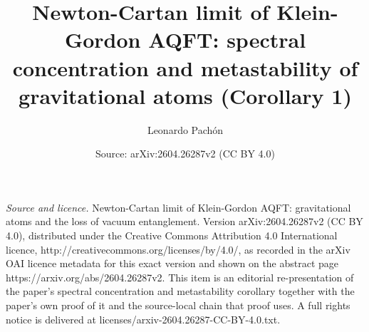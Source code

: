 \documentclass[10pt,a4paper]{amsart}
\title[Newton-Cartan limit of Klein-Gordon AQFT]{Newton-Cartan limit of Klein-Gordon AQFT: spectral concentration and metastability of gravitational atoms (Corollary 1)}
\author[Leonardo Pachon]{Leonardo
Pachón}
\date{Source: arXiv:2604.26287v2 (CC BY 4.0)}
\theoremstyle{definition}
\theoremstyle{remark}
\begin{document}
\maketitle
\vspace{1em}
\noindent\textit{Source and licence.} Newton-Cartan limit of Klein-Gordon AQFT: gravitational atoms and the loss of vacuum entanglement. Version arXiv:2604.26287v2 (CC BY 4.0), distributed under the Creative Commons Attribution 4.0 International licence, http://creativecommons.org/licenses/by/4.0/, as recorded in the arXiv OAI licence metadata for this exact version and shown on the abstract page https://arxiv.org/abs/2604.26287v2. This item is an editorial re-presentation of the paper's spectral concentration and metastability corollary together with the paper's own proof of it and the source-local chain that proof uses. A full rights notice is delivered at licenses/arxiv-2604.26287-CC-BY-4.0.txt.
\end{document}

